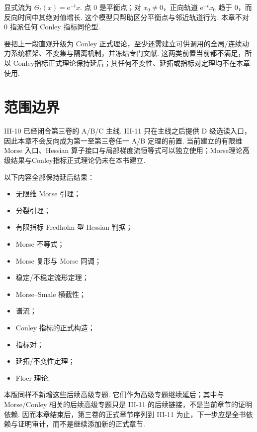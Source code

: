 \begin{FAExample}[仅作直观说明：\(\displaystyle x'=-x\) 在 \(\displaystyle\mathbb R\)]\label{iii11:conley-intuition}
显式流为 \(\displaystyle\Theta_t(x)=\mathrm{e}^{-t}x\). 点 \(\displaystyle0\) 是平衡点；对 \(\displaystyle x_0\neq0\)，正向轨道 \(\displaystyle\mathrm{e}^{-t}x_0\) 趋于 \(\displaystyle0\)，而反向时间中其绝对值增长. 这个模型只帮助区分平衡点与邻近轨道行为. 本章不对 \(\displaystyle0\) 指派任何 Conley 指标同伦型.
\end{FAExample}

\begin{FARemark}
要把上一段直观升级为 Conley 正式理论，至少还需建立可供调用的全局/连续动力系统框架、不变集与隔离机制，并冻结专门文献. 这两类前置当前都不满足，所以 Conley指标正式理论保持延后；其任何不变性、延拓或指标对定理均不在本章使用.
\end{FARemark}

\section{范围边界}\label{sec:iii11-boundary-of-scope}

III-10 已经闭合第三卷的 A/B/C 主线. III-11 只在主线之后提供 D 级选读入口，因此本章不会反向成为第一至第三卷任一 A/B 定理的前置. 当前建立的有限维 Morse 入口、Hessian 算子接口与局部梯度流恒等式可以独立使用；Morse理论高级结果与Conley指标正式理论仍未在本书建立.

以下内容全部保持延后结果：
\begin{itemize}
\item 无限维 Morse 引理；
\item 分裂引理；
\item 有限指标 Fredholm 型 Hessian 判据；
\item Morse 不等式；
\item Morse 复形与 Morse 同调；
\item 稳定/不稳定流形定理；
\item Morse--Smale 横截性；
\item 谱流；
\item Conley 指标的正式构造；
\item 指标对；
\item 延拓/不变性定理；
\item Floer 理论.
\end{itemize}

本版同样不新增这些后续高级专题. 它们作为高级专题继续延后；其中与 Morse/Conley 相关的后续高级专题只是 III-11 的后续链接，不是当前章节的证明依赖. 因而本章结束后，第三卷的正式章节序列到 III-11 为止，下一步应是全书依赖与证明审计，而不是继续添加新的正式章节.

